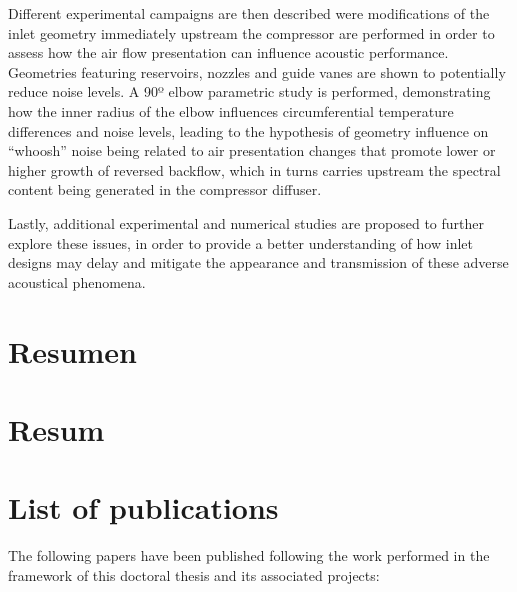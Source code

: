 \documentclass[final,twoside,11pt]{book}
\makeatletter
\numberwithin{equation}{section}
\numberwithin{figure}{chapter}
\numberwithin{table}{chapter}
\def\cleardoublepage{\clearpage\if@twoside \ifodd\c@page\else
  \hbox{}
  \thispagestyle{empty}
  \newpage
  \if@twocolumn\hbox{}\newpage\fi\fi\fi}
\makeatother
\begin{document}
Different experimental campaigns are then described were modifications of the inlet geometry immediately upstream the compressor are performed in order to assess how the air flow presentation can influence acoustic performance. Geometries featuring reservoirs, nozzles and guide vanes are shown to potentially reduce noise levels. A 90º elbow parametric study is performed, demonstrating how the inner radius of the elbow influences circumferential temperature differences and noise levels, leading to the hypothesis of geometry influence on ``whoosh'' noise being related to air presentation changes that promote lower or higher growth of reversed backflow, which in turns carries upstream the spectral content being generated in the compressor diffuser.

Lastly, additional experimental and numerical studies are proposed to further explore these issues, in order to provide a better understanding of how inlet designs may delay and mitigate the appearance and transmission of these adverse acoustical phenomena.

\cleardoublepage

\chapter*{Resumen}

\cleardoublepage

\chapter*{Resum}

\cleardoublepage

\chapter*{List of publications}

The following papers have been published following the work performed in the framework of this doctoral thesis and its associated projects:
\end{document}
